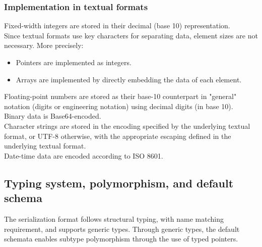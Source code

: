 \subsubsection{Implementation in textual formats}
Fixed-width integers are stored in their decimal (base 10) representation.\\
Since textual formats use key characters for separating data, element sizes are not necessary. More precisely:
\begin{itemize}
	\item Pointers are implemented as integers.
	\item Arrays are implemented by directly embedding the data of each element.
\end{itemize}
Floating-point numbers are stored as their base-10 counterpart in "general" notation (digits or engineering notation) using decimal digits (in base 10).\\
Binary data is Base64-encoded.\\
Character strings are stored in the encoding specified by the underlying textual format, or UTF-8 otherwise, with the appropriate escaping defined in the underlying textual format.\\
Date-time data are encoded according to ISO 8601.
\subsection{Typing system, polymorphism, and default schema}
The serialization format follows structural typing, with name matching requirement, and supports generic types. Through generic types, the default schemata enables subtype polymorphism through the use of typed pointers.\\
